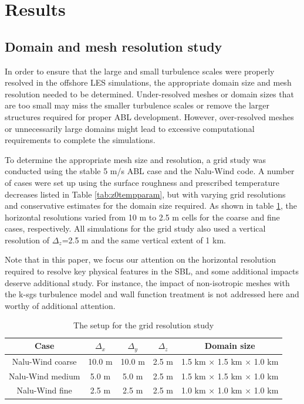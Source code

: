 \section{Results}

\subsection{\label{sec:gridstudy}Domain and mesh resolution study}

In order to ensure that the large and small turbulence scales were
properly resolved in the offshore LES simulations, the appropriate
domain size and mesh resolution needed to be determined.
Under-resolved meshes or domain sizes that are too small may miss the
smaller turbulence scales or remove the larger structures required for
proper ABL development.  However, over-resolved meshes or
unnecessarily large domains might lead to excessive computational
requirements to complete the simulations.

To determine the appropriate mesh size and resolution, a grid study
was conducted using the stable 5 m/s ABL case and the Nalu-Wind code.
A number of cases were set up using the surface roughness and
prescribed temperature decreases listed in Table
\ref{tab:z0tempparam}, but with varying grid resolutions and
conservative estimates for the domain size required.  As shown in
table \ref{tab:GridStudySetup}, the horizontal resolutions varied from
10 m to 2.5 m cells for the coarse and fine cases, respectively.  All
simulations for the grid study also used a vertical resolution of
$\Delta_z$=2.5 m and the same vertical extent of 1 km.

Note that in this paper, we focus our attention on the horizontal
resolution required to resolve key physical features in the SBL, and
some additional impacts deserve additional study.  For instance, the
impact of non-isotropic meshes with the k-sgs turbulence model and
wall function treatment is not addressed here and worthy of additional
attention.

\begin{table}
\caption{\label{tab:GridStudySetup} The setup for the grid resolution study} \centering
\begin{tabular}{ccccc}
  \hline
  Case              & $\Delta_x$ & $\Delta_y$ & $\Delta_z$ & Domain size \\
  \hline
  Nalu-Wind coarse  &  10.0 m  & 10.0 m & 2.5 m & 1.5 km $\times$ 1.5 km $\times$ 1.0 km  \\
  Nalu-Wind medium  &   5.0 m &  5.0 m  & 2.5 m & 1.5 km $\times$ 1.5 km $\times$ 1.0 km  \\
  Nalu-Wind fine    &   2.5 m &  2.5 m  & 2.5 m & 1.0 km $\times$ 1.0 km $\times$ 1.0 km  \\
\hline
\end{tabular}
\end{table}


